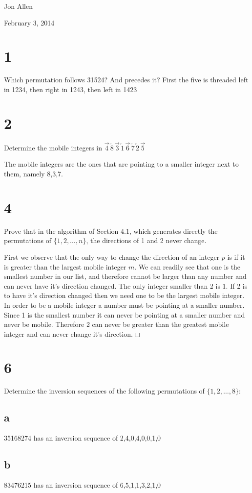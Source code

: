 \documentclass{article}
\begin{document}
Jon Allen

February 3, 2014

\section*{1}
Which permutation follows 31524? And precedes it?
First the five is threaded left in 1234, then right in 1243, then left in 1423
\section*{2}
Determine the mobile integers in $\overrightarrow{4}\,\overleftarrow{8}\,\overrightarrow{3}\,\overleftarrow{1}\,\overrightarrow{6}\,\overleftarrow{7}\,\overleftarrow{2}\,\overrightarrow{5}$

The mobile integers are the ones that are pointing to a smaller integer next to them, namely 8,3,7.
\section*{4}
Prove that in the algorithm of Section 4.1, which generates directly the permutations of $\{1,2,\dots,n\}$, the directions of 1 and 2 never change.

First we observe that the only way to change the direction of an integer $p$ is if it is greater than the largest mobile integer $m$. We can readily see that one is the smallest number in our list, and therefore cannot be larger than any number and can never have it's direction changed. The only integer smaller than 2 is 1. If 2 is to have it's direction changed then we need one to be the largest mobile integer. In order to be a mobile integer a number must be pointing at a smaller number. Since 1 is the smallest number it can never be pointing at a smaller number and never be mobile. Therefore 2 can never be greater than the greatest mobile integer and can never change it's direction.$\Box$
\section*{6}
Determine the inversion sequences of the following permutations of $\{1,2,\dots,8\}$:
\subsection*{a}
35168274 has an inversion sequence of 2,4,0,4,0,0,1,0
\subsection*{b}
83476215 has an inversion sequence of 6,5,1,1,3,2,1,0
\end{document}

